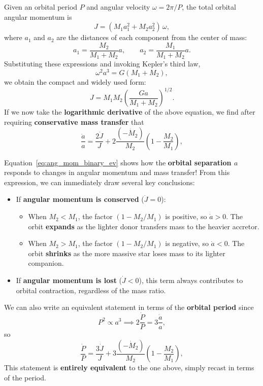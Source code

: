 Given an orbital period $P$ and angular velocity $\omega = 2\pi / P$, the total orbital angular momentum is
\[
J = (M_1 a_1^2 + M_2 a_2^2)\,\omega,
\]
where $a_1$ and $a_2$ are the distances of each component from the center of mass:
\[
a_1 = \frac{M_2}{M_1 + M_2}a,
\qquad
a_2 = \frac{M_1}{M_1 + M_2}a.
\]
Substituting these expressions and invoking Kepler’s third law,
\[
\omega^2 a^3 = G(M_1 + M_2),
\]
we obtain the compact and widely used form:
\[
\boxed{
J = M_1 M_2 \left(\frac{G a}{M_1 + M_2}\right)^{1/2}.
}
\]
If we now take the \textbf{logarithmic derivative} of the above equation, we find after requiring \textbf{conservative mass transfer} that
\begin{equation}
    \label{eq:ang_mom_binary_ev}
    \boxed{
\frac{\dot{a}}{a} = \frac{2\dot{J}}{J}
    + 2\frac{(-\dot{M}_2)}{M_2}\left(1 - \frac{M_2}{M_1}\right),}
\end{equation}
\begin{bigidea}
Equation~\eqref{eq:ang_mom_binary_ev} shows how the \textbf{orbital separation $a$} responds to changes in angular momentum and mass transfer! From this expression, we can immediately draw several key conclusions:
\begin{itemize}
    \item If \textbf{angular momentum is conserved} ($\dot{J}=0$):
    \begin{itemize}
        \item When $M_2 < M_1$, the factor $(1 - M_2/M_1)$ is positive, so $\dot{a} > 0$.  
        The orbit \textbf{expands} as the lighter donor transfers mass to the heavier accretor.
        \item When $M_2 > M_1$, the factor $(1 - M_2/M_1)$ is negative, so $\dot{a} < 0$.  
        The orbit \textbf{shrinks} as the more massive star loses mass to its lighter companion.
    \end{itemize}
    \item If \textbf{angular momentum is lost} ($\dot{J}<0$), this term always contributes to orbital contraction, regardless of the mass ratio.  
\end{itemize}
\end{bigidea}

We can also write an equivalent statement in terms of the \textbf{orbital period} since
\[
P^2 \propto a^3 \implies 2\frac{\dot{P}}{P} = 3 \frac{\dot{a}}{a},
\]
so
\begin{equation}
    \label{eq:ang_mom_period_binary_ev}
    \boxed{
\frac{\dot{P}}{P} = \frac{3\dot{J}}{J}
    + 3\frac{(-\dot{M}_2)}{M_2}\left(1 - \frac{M_2}{M_1}\right),}
\end{equation}
This statement is \textbf{entirely equivalent} to the one above, simply recast in terms of the period.

